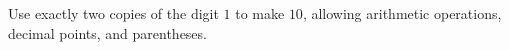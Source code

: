 Use exactly two copies of the digit $1$ to make $10$, allowing arithmetic operations, decimal points, and parentheses.
